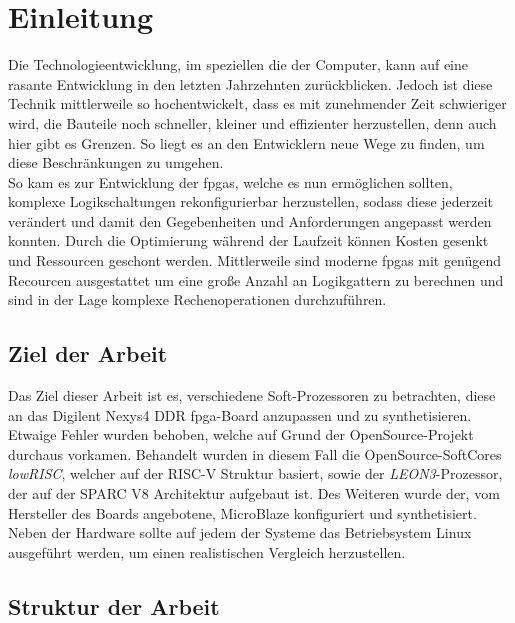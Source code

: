 \chapter{Einleitung}\label{ch:einleitung}

Die Technologieentwicklung, im speziellen die der Computer, kann auf eine rasante Entwicklung in den letzten
Jahrzehnten zurückblicken. Jedoch ist diese Technik mittlerweile so hochentwickelt, dass es mit zunehmender Zeit
schwieriger wird, die Bauteile noch schneller, kleiner und effizienter herzustellen, denn auch hier gibt es Grenzen.
So liegt es an den Entwicklern neue Wege zu finden, um diese Beschränkungen zu umgehen. \\
So kam es zur Entwicklung der \acp{fpga}, welche es nun ermöglichen sollten, komplexe Logikschaltungen
rekonfigurierbar herzustellen, sodass diese jederzeit verändert und damit den Gegebenheiten und
Anforderungen angepasst werden konnten. Durch die Optimierung während der Laufzeit können Kosten gesenkt und
Ressourcen geschont werden. Mittlerweile sind moderne \acp{fpga} mit genügend Recourcen ausgestattet um eine
große Anzahl an Logikgattern zu berechnen und sind in der Lage komplexe Rechenoperationen durchzuführen.\\

\section{Ziel der Arbeit}\label{kap:zielderarbeit}

Das Ziel dieser Arbeit ist es, verschiedene Soft-Prozessoren zu betrachten, diese an das Digilent Nexys4 DDR \ac{fpga}-Board anzupassen und zu synthetisieren. Etwaige Fehler wurden behoben,
welche auf Grund der OpenSource-Projekt durchaus vorkamen. Behandelt wurden in diesem Fall die OpenSource-SoftCores \emph{lowRISC}, welcher auf der RISC-V Struktur basiert,
 sowie der \emph{LEON3}-Prozessor,
der auf der SPARC V8 Architektur aufgebaut ist. Des Weiteren wurde der, vom Hersteller des Boards angebotene, MicroBlaze konfiguriert und synthetisiert.\\
Neben der Hardware sollte auf jedem der Systeme das Betriebsystem Linux ausgeführt werden, um einen realistischen Vergleich herzustellen.


 \section{Struktur der Arbeit}\label{kap:strukturderarbeit}

